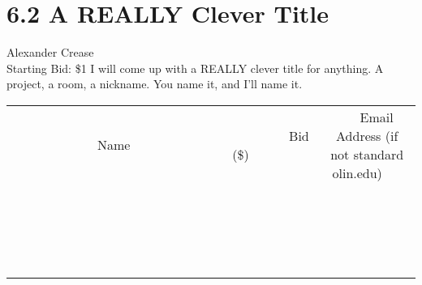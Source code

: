 \documentclass[11pt]{article}
\begin{document}
\section*{6.2 A REALLY Clever Title}
Alexander Crease
\\
Starting Bid: \$1
\newline
I will come up with a REALLY clever title for anything. A project, a room, a nickname. You name it, and I'll name it.
\\[3ex]
\begin{tabular}{c c c}
~~~~~~~~~~~~~Name~~~~~~~~~~~~~ & ~~~~~~~~~Bid (\$)~~~~~~~~~  & ~~~Email Address (if not standard olin.edu)~~~\\
 & & \\
\hline
 & & \\
\hline
 & & \\
\hline
 & & \\
\hline
 & & \\
\hline
 & & \\
\hline
 & & \\
\hline
 & & \\
\hline
 & & \\
\hline
 & & \\
\hline
 & & \\
\hline
 & & \\
\hline
 & & \\
\hline
 & & \\
\hline
 & & \\
\hline
 & & \\
\hline
 & & \\
\hline
 & & \\
\hline
 & & \\
\hline
\end{tabular}
\newpage
\end{document}
